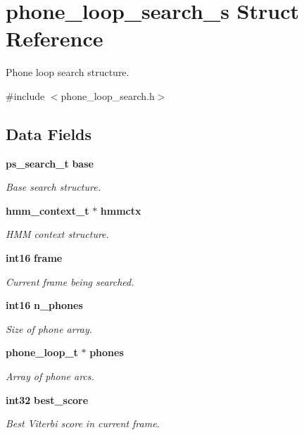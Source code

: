 \section{phone\-\_\-loop\-\_\-search\-\_\-s \-Struct \-Reference}
\label{structphone__loop__search__s}


\-Phone loop search structure.  




{\ttfamily \#include $<$phone\-\_\-loop\-\_\-search.\-h$>$}

\subsection*{\-Data \-Fields}
\begin{DoxyCompactItemize}
\item 
{\bf ps\-\_\-search\-\_\-t} {\bf base}
\begin{DoxyCompactList}\small\item\em \-Base search structure. \end{DoxyCompactList}\item 
{\bf hmm\-\_\-context\-\_\-t} $\ast$ {\bf hmmctx}
\begin{DoxyCompactList}\small\item\em \-H\-M\-M context structure. \end{DoxyCompactList}\item 
{\bf int16} {\bf frame}
\begin{DoxyCompactList}\small\item\em \-Current frame being searched. \end{DoxyCompactList}\item 
{\bf int16} {\bf n\-\_\-phones}
\begin{DoxyCompactList}\small\item\em \-Size of phone array. \end{DoxyCompactList}\item 
{\bf phone\-\_\-loop\-\_\-t} $\ast$ {\bf phones}
\begin{DoxyCompactList}\small\item\em \-Array of phone arcs. \end{DoxyCompactList}\item 
{\bf int32} {\bf best\-\_\-score}
\begin{DoxyCompactList}\small\item\em \-Best \-Viterbi score in current frame. \end{DoxyCompactList}\item 

\end{DoxyCompactItemize}
